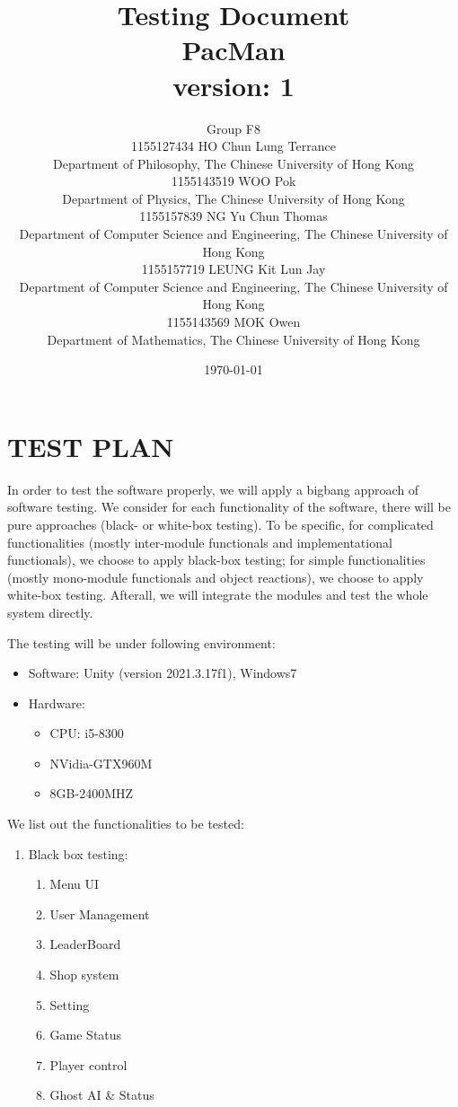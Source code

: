 \documentclass[11pt]{article}
\title{Testing Document\\PacMan\\version: 1}
\author{Group F8\\1155127434 HO Chun Lung Terrance\\
Department of Philosophy, The Chinese University of Hong Kong\\1155143519 WOO Pok\\
Department of Physics, The Chinese University of Hong Kong\\1155157839 NG Yu Chun Thomas\\
Department of Computer Science and Engineering, The Chinese University of Hong Kong\\1155157719 LEUNG Kit Lun Jay\\
Department of Computer Science and Engineering, The Chinese University of Hong Kong\\1155143569 MOK Owen\\
Department of Mathematics, The Chinese University of Hong Kong}
\date{\today}
\begin{document}
    \maketitle
    \tableofcontents
    \newpage

    \section{TEST PLAN}
    In order to test the software properly, we will apply a bigbang approach of software testing. We consider for each functionality of the software, there will be pure approaches (black- or white-box testing). To be specific, for complicated functionalities (mostly inter-module functionals and implementational functionals), we choose to apply black-box testing; for simple functionalities (mostly mono-module functionals and object reactions), we choose to apply white-box testing. Afterall, we will integrate the modules and test the whole system directly.

    The testing will be under following environment:
    \begin{itemize}
        \item Software: Unity (version 2021.3.17f1), Windows7
        \item Hardware: \begin{itemize}
            \item CPU: i5-8300
            \item NVidia-GTX960M
            \item 8GB-2400MHZ
        \end{itemize}
    \end{itemize}

    We list out the functionalities to be tested:

        \begin{enumerate}
            \item Black box testing:
            \begin{enumerate}
                \item Menu UI                
                \item User Management
                \item LeaderBoard
                \item Shop system
                \item Setting
                \item Game Status
                \item Player control
                \item Ghost AI \& Status
            \end{enumerate}
        \end{enumerate}
\end{document}
